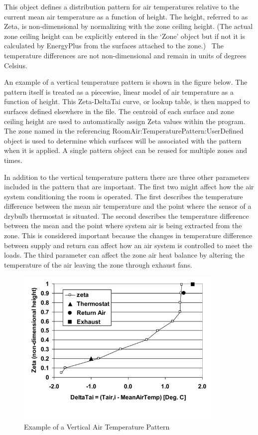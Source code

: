 This object defines a distribution pattern for air temperatures relative to the current mean air temperature as a function of height. The height, referred to as Zeta, is non-dimensional by normalizing with the zone ceiling height. (The actual zone ceiling height can be explicitly entered in the `Zone' object but if not it is calculated by EnergyPlus from the surfaces attached to the zone.)~ The temperature differences are not non-dimensional and remain in units of degrees Celsius.

An example of a vertical temperature pattern is shown in the figure below. The pattern itself is treated as a piecewise, linear model of air temperature as a function of height. This Zeta-DeltaTai curve, or lookup table, is then mapped to surfaces defined elsewhere in the file. The centroid of each surface and zone ceiling height are used to automatically assign Zeta values within the program. The zone named in the referencing RoomAir:TemperaturePattern:UserDefined object is used to determine which surfaces will be associated with the pattern when it is applied. A single pattern object can be reused for multiple zones and times.

In addition to the vertical temperature pattern there are three other parameters included in the pattern that are important. The first two might affect how the air system conditioning the room is operated. The first describes the temperature difference between the mean air temperature and the point where the sensor of a drybulb thermostat is situated. The second describes the temperature difference between the mean and the point where system air is being extracted from the zone. This is considered important because the changes in temperature difference between supply and return can affect how an air system is controlled to meet the loads. The third parameter can affect the zone air heat balance by altering the temperature of the air leaving the zone through exhaust fans.

\begin{figure}[hbtp] %
\centering
\includegraphics[width=0.9\textwidth, height=0.9\textheight, keepaspectratio=true]{media/image079.png}
\caption{Example of a Vertical Air Temperature Pattern \protect \label{fig:example-of-a-vertical-air-temperature-pattern}}
\end{figure}

